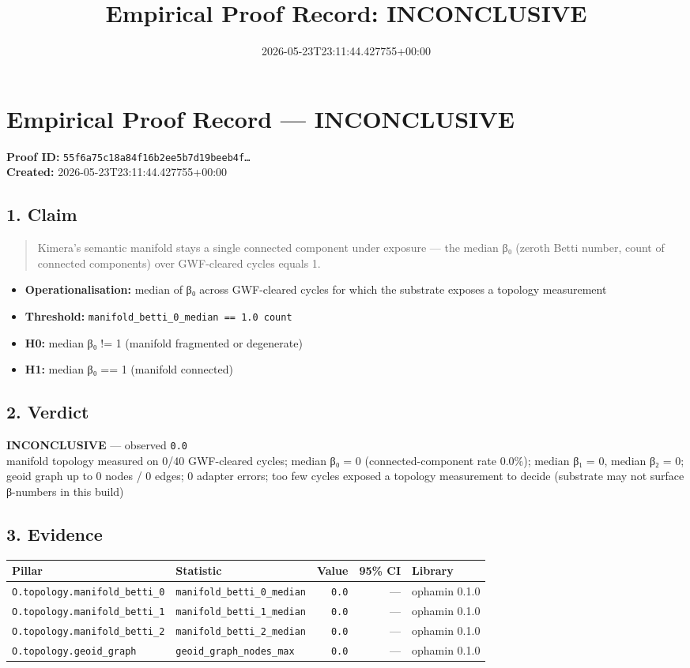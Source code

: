 \documentclass{article}
\title{Empirical Proof Record: INCONCLUSIVE}
\date{2026-05-23T23:11:44.427755+00:00}
\begin{document}
\maketitle
\section*{Empirical Proof Record --- \textcolor{inconclusive}{\textbf{INCONCLUSIVE}}}
\textbf{Proof ID:} \texttt{55f6a75c18a84f16b2ee5b7d19beeb4f\dots}\\
\textbf{Created:} 2026-05-23T23:11:44.427755+00:00
\subsection*{1. Claim}
\begin{quote}Kimera's semantic manifold stays a single connected component under exposure — the median β₀ (zeroth Betti number, count of connected components) over GWF-cleared cycles equals 1.\end{quote}
\begin{itemize}
\item \textbf{Operationalisation:} median of β₀ across GWF-cleared cycles for which the substrate exposes a topology measurement
\item \textbf{Threshold:} \texttt{manifold\_betti\_0\_median == 1.0 count}
\item \textbf{H0:} median β₀ != 1 (manifold fragmented or degenerate)
\item \textbf{H1:} median β₀ == 1 (manifold connected)
\end{itemize}
\subsection*{2. Verdict}
\textcolor{inconclusive}{\textbf{INCONCLUSIVE}} --- observed \texttt{0.0}\\
manifold topology measured on 0/40 GWF-cleared cycles; median β₀ = 0 (connected-component rate 0.0\%); median β₁ = 0, median β₂ = 0; geoid graph up to 0 nodes / 0 edges; 0 adapter errors; too few cycles exposed a topology measurement to decide (substrate may not surface β-numbers in this build)
\subsection*{3. Evidence}
\begin{tabular}{llrrl}\toprule
\textbf{Pillar} & \textbf{Statistic} & \textbf{Value} & \textbf{95\% CI} & \textbf{Library} \\\midrule
\texttt{O.topology.manifold\_betti\_0} & \texttt{manifold\_betti\_0\_median} & \texttt{0.0} & --- & ophamin 0.1.0 \\
\texttt{O.topology.manifold\_betti\_1} & \texttt{manifold\_betti\_1\_median} & \texttt{0.0} & --- & ophamin 0.1.0 \\
\texttt{O.topology.manifold\_betti\_2} & \texttt{manifold\_betti\_2\_median} & \texttt{0.0} & --- & ophamin 0.1.0 \\
\texttt{O.topology.geoid\_graph} & \texttt{geoid\_graph\_nodes\_max} & \texttt{0.0} & --- & ophamin 0.1.0 \\
\bottomrule\end{tabular}
\end{document}
